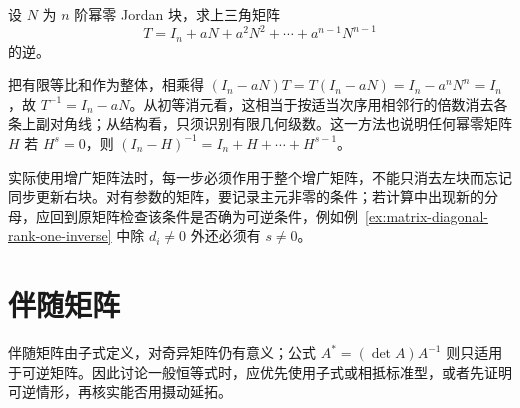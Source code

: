 \begin{example}
\label{ex:matrix-geometric-triangular-inverse}
设 $N$ 为 $n$ 阶幂零 Jordan 块，求上三角矩阵
\[
 T=I_n+aN+a^2N^2+\cdots+a^{n-1}N^{n-1}
\]
的逆。
\end{example}
\begin{solve}
把有限等比和作为整体，相乘得 $(I_n-aN)T=T(I_n-aN)=I_n-a^nN^n=I_n$，故 $T^{-1}=I_n-aN$。从初等消元看，这相当于按适当次序用相邻行的倍数消去各条上副对角线；从结构看，只须识别有限几何级数。这一方法也说明任何幂零矩阵 $H$ 若 $H^s=0$，则 $(I_n-H)^{-1}=I_n+H+\cdots+H^{s-1}$。
\end{solve}

实际使用增广矩阵法时，每一步必须作用于整个增广矩阵，不能只消去左块而忘记同步更新右块。对有参数的矩阵，要记录主元非零的条件；若计算中出现新的分母，应回到原矩阵检查该条件是否确为可逆条件，例如例~\ref{ex:matrix-diagonal-rank-one-inverse} 中除 $d_i\ne0$ 外还必须有 $s\ne0$。

\section{伴随矩阵}
\label{sec:matrix-adjugate}

伴随矩阵由子式定义，对奇异矩阵仍有意义；公式 $A^*=(\det A)A^{-1}$ 则只适用于可逆矩阵。因此讨论一般恒等式时，应优先使用子式或相抵标准型，或者先证明可逆情形，再核实能否用摄动延拓。

